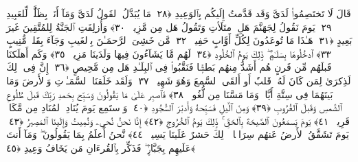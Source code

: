  قَالَ لَا تَختَصِمُوا۟ لَدَىَّ وَقَد قَدَّمتُ إِلَيكُم بِٱلوَعِيدِ ﴿٢٨﴾
 مَا يُبَدَّلُ ٱلقَولُ لَدَىَّ وَمَآ أَنَا۠ بِظَلَّٰمٍۢ لِّلعَبِيدِ ﴿٢٩﴾
 يَومَ نَقُولُ لِجَهَنَّمَ هَلِ ٱمتَلَأتِ وَتَقُولُ هَل مِن مَّزِيدٍۢ ﴿٣٠﴾
 وَأُزلِفَتِ ٱلجَنَّةُ لِلمُتَّقِينَ غَيرَ بَعِيدٍ ﴿٣١﴾
 هَـٰذَا مَا تُوعَدُونَ لِكُلِّ أَوَّابٍ حَفِيظٍۢ ﴿٣٢﴾
 مَّن خَشِىَ ٱلرَّحمَـٰنَ بِٱلغَيبِ وَجَآءَ بِقَلبٍۢ مُّنِيبٍ ﴿٣٣﴾
 ٱدخُلُوهَا بِسَلَـٰمٍۢ ۖ ذَٟلِكَ يَومُ ٱلخُلُودِ ﴿٣٤﴾
 لَهُم مَّا يَشَآءُونَ فِيهَا وَلَدَينَا مَزِيدٌۭ ﴿٣٥﴾
 وَكَم أَهلَكنَا قَبلَهُم مِّن قَرنٍ هُم أَشَدُّ مِنهُم بَطشًۭا فَنَقَّبُوا۟ فِى ٱلبِلَـٰدِ هَل مِن مَّحِيصٍ ﴿٣٦﴾
 إِنَّ فِى ذَٟلِكَ لَذِكرَىٰ لِمَن كَانَ لَهُۥ قَلبٌ أَو أَلقَى ٱلسَّمعَ وَهُوَ شَهِيدٌۭ ﴿٣٧﴾
 وَلَقَد خَلَقنَا ٱلسَّمَـٰوَٟتِ وَٱلأَرضَ وَمَا بَينَهُمَا فِى سِتَّةِ أَيَّامٍۢ وَمَا مَسَّنَا مِن لُّغُوبٍۢ ﴿٣٨﴾
 فَٱصبِر عَلَىٰ مَا يَقُولُونَ وَسَبِّح بِحَمدِ رَبِّكَ قَبلَ طُلُوعِ ٱلشَّمسِ وَقَبلَ ٱلغُرُوبِ ﴿٣٩﴾
 وَمِنَ ٱلَّيلِ فَسَبِّحهُ وَأَدبَٰرَ ٱلسُّجُودِ ﴿٤٠﴾
 وَٱستَمِع يَومَ يُنَادِ ٱلمُنَادِ مِن مَّكَانٍۢ قَرِيبٍۢ ﴿٤١﴾
 يَومَ يَسمَعُونَ ٱلصَّيحَةَ بِٱلحَقِّ ۚ ذَٟلِكَ يَومُ ٱلخُرُوجِ ﴿٤٢﴾
 إِنَّا نَحنُ نُحىِۦ وَنُمِيتُ وَإِلَينَا ٱلمَصِيرُ ﴿٤٣﴾
 يَومَ تَشَقَّقُ ٱلأَرضُ عَنهُم سِرَاعًۭا ۚ ذَٟلِكَ حَشرٌ عَلَينَا يَسِيرٌۭ ﴿٤٤﴾
 نَّحنُ أَعلَمُ بِمَا يَقُولُونَ ۖ وَمَآ أَنتَ عَلَيهِم بِجَبَّارٍۢ ۖ فَذَكِّر بِٱلقُرءَانِ مَن يَخَافُ وَعِيدِ ﴿٤٥﴾
 
